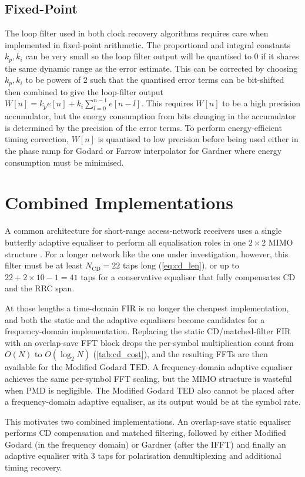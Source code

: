 \documentclass[12pt,a4paper]{report}
\begin{document}
\subsection{Fixed-Point}
The loop filter used in both clock recovery algorithms requires care when implemented in fixed-point arithmetic. The proportional and integral constants $k_p, k_i$ can be very small so the loop filter output will be quantised to 0 if it shares the same dynamic range as the error estimate. This can be corrected by choosing $k_p, k_i$ to be powers of 2 such that the quantised error terms can be bit-shifted then combined to give the loop-filter output $W[n] = k_p e[n] + k_i\sum_{l=0}^{n-1}e[n-l]$. This requires $W[n]$ to be a high precision accumulator, but the energy consumption from bits changing in the accumulator is determined by the precision of the error terms. To perform energy-efficient timing correction, $W[n]$ is quantised to low precision before being used either in the phase ramp for Godard or Farrow interpolator for Gardner where energy consumption must be minimised.

\section{Combined Implementations}\label{sec:combined_impl}
A common architecture for short-range access-network receivers uses a single butterfly adaptive equaliser to perform all equalisation roles in one $2\times 2$ MIMO structure \cite{Cheng;20}. For a longer network like the one under investigation, however, this filter must be at least $N_\mathrm{CD} = 22$ taps long (\cref{eq:cd_len}), or up to $22 + 2\times10 - 1 = 41$ taps for a conservative equaliser that fully compensates CD and the RRC span.

At those lengths a time-domain FIR is no longer the cheapest implementation, and both the static and the adaptive equalisers become candidates for a frequency-domain implementation. Replacing the static CD/matched-filter FIR with an overlap-save FFT block drops the per-symbol multiplication count from $O(N)$ to $O(\log_2 N)$ (\cref{tab:cd_cost}), and the resulting FFTs are then available for the Modified Godard TED. A frequency-domain adaptive equaliser \cite{Faruk:11} achieves the same per-symbol FFT scaling, but the MIMO structure is wasteful when PMD is negligible. The Modified Godard TED also cannot be placed after a frequency-domain adaptive equaliser, as its output would be at the symbol rate.

This motivates two combined implementations. An overlap-save static equaliser performs CD compensation and matched filtering, followed by either Modified Godard (in the frequency domain) or Gardner (after the IFFT) and finally an adaptive equaliser with 3 taps for polarisation demultiplexing and additional timing recovery.
\end{document}
